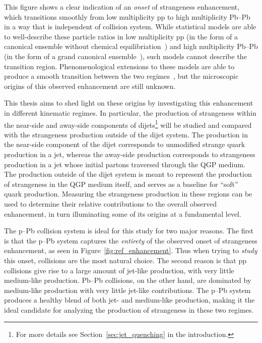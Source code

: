 This figure shows a clear indication of an \textit{onset} of strangeness enhancement, which transitions smoothly from low multiplicity pp to high multiplicity Pb--Pb in a way that is independent of collision system. While statistical models are able to well-describe these particle ratios in low multiplicity pp (in the form of a canonical ensemble without chemical equilibriation~\cite{NATURE14, NATURE15}) and high multiplicity Pb--Pb (in the form of a grand canonical ensemble~\cite{NATURE12, NATURE13}), such models cannot describe the transition region. Phenomenological extensions to these models are able to produce a smooth transition between the two regimes~\cite{NATURE16, NATURE17}, but the microscopic origins of this observed enhancement are still unknown. 

This thesis aims to shed light on these origins by investigating this enhancement in different kinematic regimes. In particular, the production of strangeness within the near-side and away-side components of dijets\footnote{For more details see Section~\ref{sec:jet_quenching} in the introduction.} will be studied and compared with the strangeness production outside of the dijet system. The production in the near-side component of the dijet corresponds to unmodified strange quark production in a jet, whereas the away-side production corresponds to strangeness production in a jet whose initial partons traversed through the QGP medium. The production outside of the dijet system is meant to represent the production of strangeness in the QGP medium itself, and serves as a baseline for ``soft'' quark production. Measuring the strangeness production in these regions can be used to determine their relative contributions to the overall observed enhancement, in turn illuminating some of its origins at a fundamental level.

The p--Pb collision system is ideal for this study for two major reasons. The first is that the p--Pb system captures the \textit{entirety} of the observed onset of strangeness enhancement, as seen in Figure~\ref{fig:ref_enhancement}. Thus when trying to \textit{study} this onset, \pPb collisions are the most natural choice. The second reason is that pp collisions give rise to a large amount of jet-like production, with very little medium-like production. Pb--Pb collisions, on the other hand, are dominated by medium-like production with very little jet-like contributions. The p--Pb system produces a healthy blend of both jet- and medium-like production, making it the ideal candidate for analyzing the production of strangeness in these two regimes.

